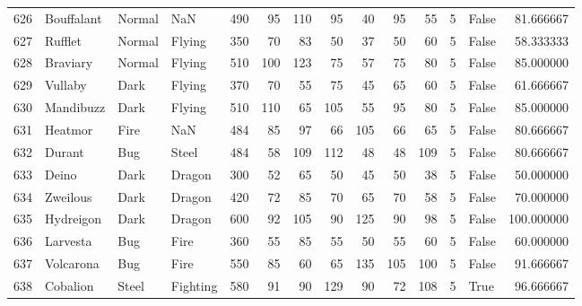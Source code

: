 \begin{tabular}{rlllrrrrrrrrlr}
 626 &                 Bouffalant &    Normal &       NaN &    490 &   95 &     110 &       95 &       40 &       95 &     55 &           5 &      False &   81.666667 \\
 627 &                    Rufflet &    Normal &    Flying &    350 &   70 &      83 &       50 &       37 &       50 &     60 &           5 &      False &   58.333333 \\
 628 &                   Braviary &    Normal &    Flying &    510 &  100 &     123 &       75 &       57 &       75 &     80 &           5 &      False &   85.000000 \\
 629 &                    Vullaby &      Dark &    Flying &    370 &   70 &      55 &       75 &       45 &       65 &     60 &           5 &      False &   61.666667 \\
 630 &                  Mandibuzz &      Dark &    Flying &    510 &  110 &      65 &      105 &       55 &       95 &     80 &           5 &      False &   85.000000 \\
 631 &                    Heatmor &      Fire &       NaN &    484 &   85 &      97 &       66 &      105 &       66 &     65 &           5 &      False &   80.666667 \\
 632 &                     Durant &       Bug &     Steel &    484 &   58 &     109 &      112 &       48 &       48 &    109 &           5 &      False &   80.666667 \\
 633 &                      Deino &      Dark &    Dragon &    300 &   52 &      65 &       50 &       45 &       50 &     38 &           5 &      False &   50.000000 \\
 634 &                   Zweilous &      Dark &    Dragon &    420 &   72 &      85 &       70 &       65 &       70 &     58 &           5 &      False &   70.000000 \\
 635 &                  Hydreigon &      Dark &    Dragon &    600 &   92 &     105 &       90 &      125 &       90 &     98 &           5 &      False &  100.000000 \\
 636 &                   Larvesta &       Bug &      Fire &    360 &   55 &      85 &       55 &       50 &       55 &     60 &           5 &      False &   60.000000 \\
 637 &                  Volcarona &       Bug &      Fire &    550 &   85 &      60 &       65 &      135 &      105 &    100 &           5 &      False &   91.666667 \\
 638 &                   Cobalion &     Steel &  Fighting &    580 &   91 &      90 &      129 &       90 &       72 &    108 &           5 &       True &   96.666667 \\

\end{tabular}
